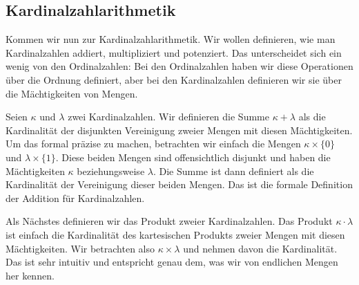 \subsection{Kardinalzahlarithmetik}

\begin{spoken-clean}[01:07:21 - 01:09:45]
Kommen wir nun zur Kardinalzahlarithmetik. Wir wollen definieren, wie man Kardinalzahlen addiert, multipliziert und potenziert. Das unterscheidet sich ein wenig von den Ordinalzahlen: Bei den Ordinalzahlen haben wir diese Operationen über die Ordnung definiert, aber bei den Kardinalzahlen definieren wir sie über die Mächtigkeiten von Mengen.
\end{spoken-clean}

\begin{spoken-clean}[01:09:45 - 01:12:09]
Seien $\kappa$ und $\lambda$ zwei Kardinalzahlen. Wir definieren die Summe $\kappa + \lambda$ als die Kardinalität der disjunkten Vereinigung zweier Mengen mit diesen Mächtigkeiten. Um das formal präzise zu machen, betrachten wir einfach die Mengen $\kappa \times \{0\}$ und $\lambda \times \{1\}$. Diese beiden Mengen sind offensichtlich disjunkt und haben die Mächtigkeiten $\kappa$ beziehungsweise $\lambda$. Die Summe ist dann definiert als die Kardinalität der Vereinigung dieser beiden Mengen. Das ist die formale Definition der Addition für Kardinalzahlen.
\end{spoken-clean}

\begin{math-stroke}
\end{math-stroke}

\begin{spoken-clean}[01:12:09 - 01:14:20]
Als Nächstes definieren wir das Produkt zweier Kardinalzahlen. Das Produkt $\kappa \cdot \lambda$ ist einfach die Kardinalität des kartesischen Produkts zweier Mengen mit diesen Mächtigkeiten. Wir betrachten also $\kappa \times \lambda$ und nehmen davon die Kardinalität. Das ist sehr intuitiv und entspricht genau dem, was wir von endlichen Mengen her kennen.
\end{spoken-clean}

